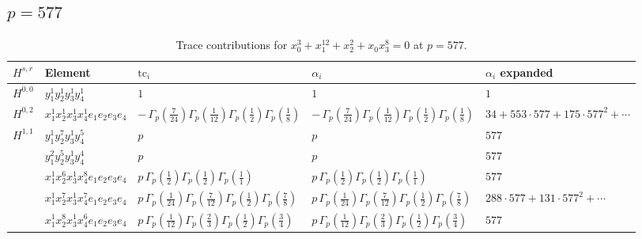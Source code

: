 \documentclass[11pt]{article}
\begin{document}
\subsection*{$p = 577$}

\begin{table}[ht]
\centering
\caption{Trace contributions for $x_0^{3} + x_1^{12} + x_2^{2} + x_0 x_3^{8} = 0$ at $p=577$.}\label{tab:deformed-21}
\renewcommand{\arraystretch}{1.1}
{\scriptsize
\begin{tabular}{@{}lllll@{}}
\toprule
$H^{s,r}$ & Element & $\mathrm{tc}_i$ & $\alpha_i$ & $\alpha_i$ expanded \\
\midrule
$H^{0,0}$ & $y_{1}^{1} y_{2}^{1} y_{3}^{1} y_{4}^{1}$ & $1$ & $1$ & $1$ \\
\midrule
$H^{0,2}$ & $x_{1}^{1} x_{2}^{1} x_{3}^{1} x_{4}^{1}  e_{1} e_{2} e_{3} e_{4}$ & $- \, \Gamma_p \left( \frac{7}{24} \right) \Gamma_p \left( \frac{1}{12} \right) \Gamma_p \left( \frac{1}{2} \right) \Gamma_p \left( \frac{1}{8} \right)$ & $- \, \Gamma_p \left( \frac{7}{24} \right) \Gamma_p \left( \frac{1}{12} \right) \Gamma_p \left( \frac{1}{2} \right) \Gamma_p \left( \frac{1}{8} \right)$ & $34{+}553{\cdot}577{+}175{\cdot}577^{2}{+}\cdots$ \\
\midrule
$H^{1,1}$ & $y_{1}^{1} y_{2}^{7} y_{3}^{1} y_{4}^{5}$ & $p \,$ & $p \,$ & $577$ \\
 & $y_{1}^{2} y_{2}^{5} y_{3}^{1} y_{4}^{4}$ & $p \,$ & $p \,$ & $577$ \\
 & $x_{1}^{1} x_{2}^{6} x_{3}^{1} x_{4}^{8}  e_{1} e_{2} e_{3} e_{4}$ & $p \, \Gamma_p \left( \frac{1}{2} \right) \Gamma_p \left( \frac{1}{2} \right) \Gamma_p \left( \frac{1}{1} \right)$ & $p \, \Gamma_p \left( \frac{1}{2} \right) \Gamma_p \left( \frac{1}{2} \right) \Gamma_p \left( \frac{1}{1} \right)$ & $577$ \\
 & $x_{1}^{1} x_{2}^{7} x_{3}^{1} x_{4}^{7}  e_{1} e_{2} e_{3} e_{4}$ & $p \, \Gamma_p \left( \frac{1}{24} \right) \Gamma_p \left( \frac{7}{12} \right) \Gamma_p \left( \frac{1}{2} \right) \Gamma_p \left( \frac{7}{8} \right)$ & $p \, \Gamma_p \left( \frac{1}{24} \right) \Gamma_p \left( \frac{7}{12} \right) \Gamma_p \left( \frac{1}{2} \right) \Gamma_p \left( \frac{7}{8} \right)$ & $288{\cdot}577{+}131{\cdot}577^{2}{+}\cdots$ \\
 & $x_{1}^{1} x_{2}^{8} x_{3}^{1} x_{4}^{6}  e_{1} e_{2} e_{3} e_{4}$ & $p \, \Gamma_p \left( \frac{1}{12} \right) \Gamma_p \left( \frac{2}{3} \right) \Gamma_p \left( \frac{1}{2} \right) \Gamma_p \left( \frac{3}{4} \right)$ & $p \, \Gamma_p \left( \frac{1}{12} \right) \Gamma_p \left( \frac{2}{3} \right) \Gamma_p \left( \frac{1}{2} \right) \Gamma_p \left( \frac{3}{4} \right)$ & $577$ \\

\end{tabular}}
\end{table}
\end{document}
